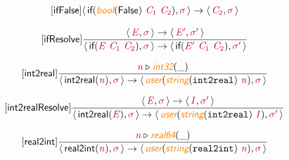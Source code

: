 \documentclass[10pt,leqno,fleqn]{article}
\newcommand{\artVariable}[1]{\mbox{\color{purple}\em #1\/}}
\newcommand{\artConstructor}[1]{\mbox{\sf #1}}
\newcommand{\artCaseInsensitiveLiteral}[1]{\mbox{\tt #1}}
\newcommand{\artSpecial}[1]{\mbox{\color{orange}\sf\em #1}}
\begin{document}
\begin{equation}
\tag*{[\artConstructor{\sf ifFalse}]}
\begin{split}\langle\, \artConstructor{\sf if}(\artSpecial{bool}(\artConstructor{\sf False})\ \artVariable{C$_{1}$}\ \artVariable{C$_{2}$}), \artVariable{$\sigma$}\,\rangle \rightarrow \langle\, \artVariable{C$_{2}$}, \artVariable{$\sigma$}\,\rangle 
\end{split}
\end{equation}

\begin{equation}
\tag*{[\artConstructor{\sf ifResolve}]}
\begin{split}\frac{\langle\, \artVariable{E}, \artVariable{$\sigma$}\,\rangle \rightarrow \langle\, \artVariable{E\/$^\prime$}, \artVariable{$\sigma$\/$^\prime$}\,\rangle }{\langle\, \artConstructor{\sf if}(\artVariable{E}\ \artVariable{C$_{1}$}\ \artVariable{C$_{2}$}), \artVariable{$\sigma$}\,\rangle \rightarrow \langle\, \artConstructor{\sf if}(\artVariable{E\/$^\prime$}\ \artVariable{C$_{1}$}\ \artVariable{C$_{2}$}), \artVariable{$\sigma$\/$^\prime$}\,\rangle }
\end{split}
\end{equation}

\begin{equation}
\tag*{[\artConstructor{\sf int2real}]}
\begin{split}\frac{ \artVariable{n}\triangleright \artSpecial{int32}(\_) }{\langle\, \artConstructor{\sf int2real}(\artVariable{n}), \artVariable{$\sigma$}\,\rangle \rightarrow \langle\, \artSpecial{user}(\artSpecial{string}(\artCaseInsensitiveLiteral{int2real})\ \artVariable{n}), \artVariable{$\sigma$}\,\rangle }
\end{split}
\end{equation}

\begin{equation}
\tag*{[\artConstructor{\sf int2realResolve}]}
\begin{split}\frac{\langle\, \artVariable{E}, \artVariable{$\sigma$}\,\rangle \rightarrow \langle\, \artVariable{I}, \artVariable{$\sigma$\/$^\prime$}\,\rangle }{\langle\, \artConstructor{\sf int2real}(\artVariable{E}), \artVariable{$\sigma$}\,\rangle \rightarrow \langle\, \artSpecial{user}(\artSpecial{string}(\artCaseInsensitiveLiteral{int2real})\ \artVariable{I}), \artVariable{$\sigma$\/$^\prime$}\,\rangle }
\end{split}
\end{equation}

\begin{equation}
\tag*{[\artConstructor{\sf real2int}]}
\begin{split}\frac{ \artVariable{n}\triangleright \artSpecial{real64}(\_) }{\langle\, \artConstructor{\sf real2int}(\artVariable{n}), \artVariable{$\sigma$}\,\rangle \rightarrow \langle\, \artSpecial{user}(\artSpecial{string}(\artCaseInsensitiveLiteral{real2int})\ \artVariable{n}), \artVariable{$\sigma$}\,\rangle }
\end{split}
\end{equation}
\end{document}
